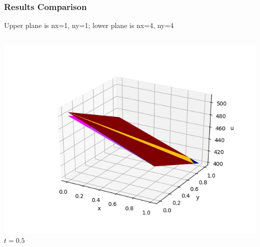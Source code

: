 \documentclass[]{beamer}
\begin{document}
\begin{frame}[t]\frametitle{Results Comparison}
  Upper plane is nx=1, ny=1; lower plane is nx=4, ny=4
  	\begin{columns}
			\begin{center}
			\includegraphics[scale=0.2]{figures/2D_xy_ls1mat_u_vs_x_05}\\
			\tiny$t=0.5$
			
			\null
			

\end{center}
\end{columns}
\end{frame}
\end{document}

